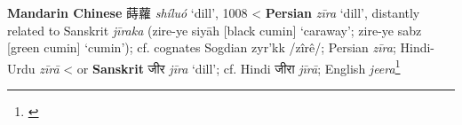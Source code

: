\begin{etymology}\label{ety:shiluo}
\textbf{Mandarin Chinese} {蒔蘿} \textit{shíluó} `dill', 1008
< \textbf{Persian} \textit{zīra} `dill', distantly related to Sanskrit \textit{jīraka} (zire-ye siyāh [black cumin] `caraway'; zire-ye sabz [green cumin] `cumin'); cf. cognates Sogdian zyr'kk /zîrê/; Persian \textit{zīra}; Hindi-Urdu \textit{zīrā}
< or \textbf{Sanskrit} {जीर} \textit{jīra} `dill'; cf. Hindi जीरा \textit{jīrā}; English \textit{jeera}\footnote{\textcite[634]{steingass_comprehensive_1892}}
\end{etymology}